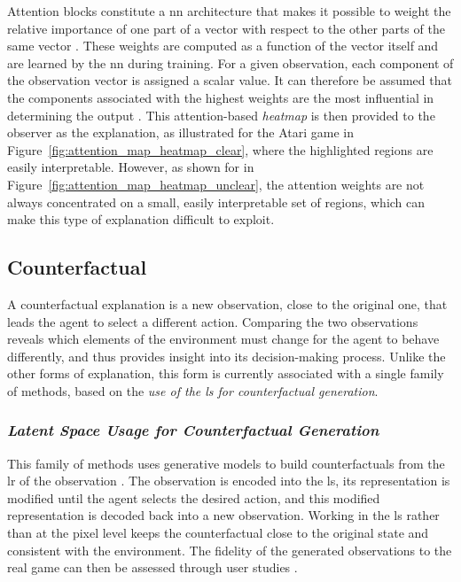 Attention blocks constitute a \gls{nn} architecture that makes it possible to weight the relative importance of one part of a vector with respect to the other parts of the same vector \parencite{vaswani2017attention}.
These weights are computed as a function of the vector itself and are learned by the \gls{nn} during training.
For a given observation, each component of the observation vector is assigned a scalar value.
It can therefore be assumed that the components associated with the highest weights are the most influential in determining the output \parencite{mott2019towards, itaya2021visual}.
This attention-based \textit{heatmap} is then provided to the observer as the explanation, as illustrated for the Atari game \BreakoutName in Figure~\ref{fig:attention_map_heatmap_clear}, where the highlighted regions are easily interpretable.
However, as shown for \MsPacManName in Figure~\ref{fig:attention_map_heatmap_unclear}, the attention weights are not always concentrated on a small, easily interpretable set of regions, which can make this type of explanation difficult to exploit.



\subsection{Counterfactual}
\label{subsec:counterfactual}

A counterfactual explanation is a new observation, close to the original one, that leads the agent to select a different action.
Comparing the two observations reveals which elements of the environment must change for the agent to behave differently, and thus provides insight into its decision-making process.
Unlike the other forms of explanation, this form is currently associated with a single family of methods, based on the \textit{use of the \gls{ls} for counterfactual generation}.

\subsubsection*{\textit{Latent Space Usage for Counterfactual Generation}}
\label{subsubsec:latent_space_counterfactual_generation}

This family of methods uses generative models to build counterfactuals from the \gls{lr} of the observation \parencite{bond2021deep, olson2021counterfactual}.
The observation is encoded into the \gls{ls}, its representation is modified until the agent selects the desired action, and this modified representation is decoded back into a new observation.
Working in the \gls{ls} rather than at the pixel level keeps the counterfactual close to the original state and consistent with the environment.
The fidelity of the generated observations to the real game can then be assessed through user studies \parencite{olson2021counterfactual}.

